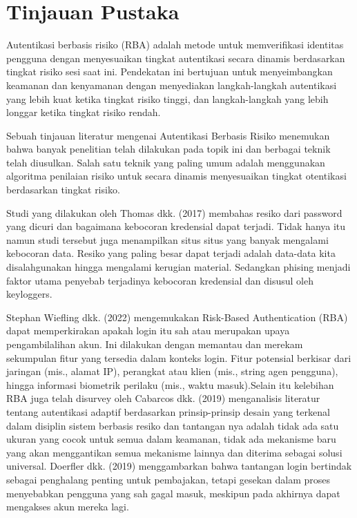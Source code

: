 \chapter{Tinjauan Pustaka}

Autentikasi berbasis risiko (RBA) adalah metode untuk memverifikasi identitas
pengguna dengan menyesuaikan tingkat autentikasi secara dinamis berdasarkan
tingkat risiko sesi saat ini. Pendekatan ini bertujuan untuk menyeimbangkan
keamanan dan kenyamanan dengan menyediakan langkah-langkah autentikasi yang
lebih kuat ketika tingkat risiko tinggi, dan langkah-langkah yang lebih longgar
ketika tingkat risiko rendah.

Sebuah tinjauan literatur mengenai Autentikasi Berbasis Risiko menemukan
bahwa banyak penelitian telah dilakukan pada topik ini dan berbagai teknik telah
diusulkan. Salah satu teknik yang paling umum adalah menggunakan algoritma
penilaian risiko untuk secara dinamis menyesuaikan tingkat otentikasi berdasarkan
tingkat risiko.

Studi yang dilakukan oleh Thomas dkk. (2017) membahas resiko dari password
yang dicuri dan bagaimana kebocoran kredensial dapat terjadi. Tidak hanya itu
namun studi tersebut juga menampilkan situs situs yang banyak mengalami
kebocoran data. Resiko yang paling besar dapat terjadi adalah data-data kita
disalahgunakan hingga mengalami kerugian material. Sedangkan phising menjadi
faktor utama penyebab terjadinya kebocoran kredensial dan disusul oleh
keyloggers.

Stephan Wiefling dkk. (2022) mengemukakan Risk-Based Authentication
(RBA) dapat memperkirakan apakah login itu sah atau merupakan upaya
pengambilalihan akun. Ini dilakukan dengan memantau dan merekam sekumpulan
fitur yang tersedia dalam konteks login. Fitur potensial berkisar dari jaringan (mis.,
alamat IP), perangkat atau klien (mis., string agen pengguna), hingga informasi
biometrik perilaku (mis., waktu masuk).Selain itu kelebihan RBA juga telah disurvey oleh Cabarcos dkk. (2019)
menganalisis literatur tentang autentikasi adaptif berdasarkan prinsip-prinsip desain
yang terkenal dalam disiplin sistem berbasis resiko dan tantangan nya adalah tidak
ada satu ukuran yang cocok untuk semua dalam keamanan, tidak ada mekanisme baru yang akan menggantikan semua mekanisme lainnya dan diterima sebagai
solusi universal. Doerfler dkk. (2019) menggambarkan bahwa tantangan login
bertindak sebagai penghalang penting untuk pembajakan, tetapi gesekan dalam
proses menyebabkan pengguna yang sah gagal masuk, meskipun pada akhirnya
dapat mengakses akun mereka lagi.

